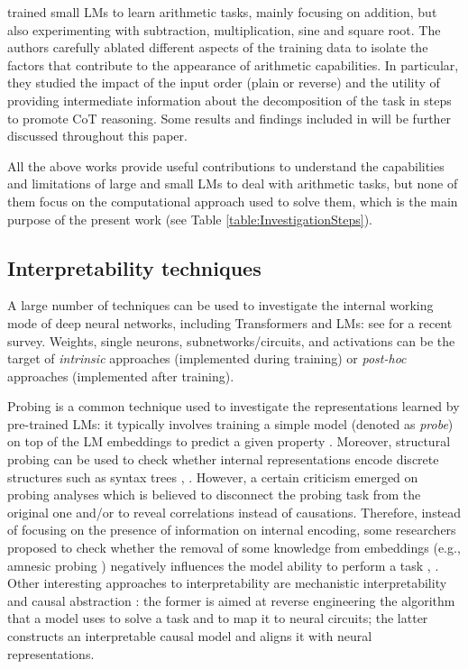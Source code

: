 \documentclass[final,1p,times,authoryear]{elsarticle}
\begin{document}
\citet{Lee2023} trained small LMs to learn arithmetic tasks, mainly focusing on addition, but also experimenting with subtraction, multiplication, sine and square root. The authors carefully ablated different aspects of the training data to isolate the factors that contribute to the appearance of arithmetic capabilities. In particular, they studied the impact of the input order (plain or reverse) and the utility of providing intermediate information about the decomposition of the task in steps to promote CoT reasoning. Some results and findings included in \citet{Lee2023} will be further discussed throughout this paper.

All the above works provide useful contributions to understand the capabilities and limitations of large and small LMs to deal with arithmetic tasks, but none of them focus on the computational approach used to solve them, which is the main purpose of the present work (see Table \ref{table:InvestigationSteps}).

\subsection{Interpretability techniques}

A large number of techniques can be used to investigate the internal working mode of deep neural networks, including Transformers and LMs: see \citet{Rauker2023} for a recent survey. Weights, single neurons, subnetworks/circuits, and activations can be the target of \textit{intrinsic} approaches (implemented during training) or \textit{post-hoc} approaches (implemented after training).

Probing is a common technique used to investigate the representations learned by pre-trained LMs: it typically involves training a simple model (denoted as \textit{probe}) on top of the LM embeddings to predict a given property \citep{Belinkov2022}. Moreover, structural probing can be used to check whether internal representations encode discrete structures such as syntax trees \citep{Hewitt2019}, \citep{White2021}. However, a certain criticism emerged on probing analyses which is believed to disconnect the probing task from the original one and/or to reveal correlations instead of causations. Therefore, instead of focusing on the presence of information on internal encoding, some researchers proposed to check whether the removal of some knowledge from embeddings (e.g., amnesic probing \citep{Elazar2021}) negatively influences the model ability to perform a task \citep{Elazar2021}, \citep{Lasri2022}. Other interesting approaches to interpretability are mechanistic interpretability \citep{Elhage2021}  and causal abstraction \citep{Geiger2021}: the former is aimed at reverse engineering the algorithm that a model uses to solve a task and to map it to neural circuits; the latter constructs an interpretable causal model and aligns it with neural representations.
\end{document}
